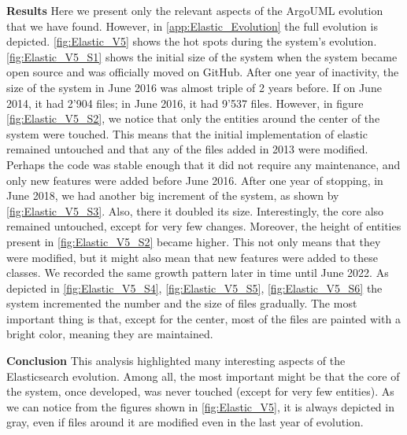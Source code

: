 \textbf{Results}
Here we present only the relevant aspects of the ArgoUML evolution that we have found. However, in \autoref{app:Elastic_Evolution} the full evolution is depicted. \autoref{fig:Elastic_V5} shows the hot spots during the system's evolution. \autoref{fig:Elastic_V5_S1} shows the initial size of the system when the system became open source and was officially moved on GitHub. After one year of inactivity, the size of the system in June 2016 was almost triple of 2 years before. If on June 2014, it had 2'904 files; in June 2016, it had 9'537 files. However, in figure \autoref{fig:Elastic_V5_S2}, we notice that only the entities around the center of the system were touched. This means that the initial implementation of elastic remained untouched and that any of the files added in 2013 were modified. Perhaps the code was stable enough that it did not require any maintenance, and only new features were added before June 2016. After one year of stopping, in June 2018, we had another big increment of the system, as shown by \autoref{fig:Elastic_V5_S3}. Also, there it doubled its size. Interestingly, the core also remained untouched, except for very few changes. Moreover, the height of entities present in \autoref{fig:Elastic_V5_S2} became higher. This not only means that they were modified, but it might also mean that new features were added to these classes. We recorded the same growth pattern later in time until June 2022. As depicted in \autoref{fig:Elastic_V5_S4}, \autoref{fig:Elastic_V5_S5}, \autoref{fig:Elastic_V5_S6} the system incremented the number and the size of files gradually. The most important thing is that, except for the center, most of the files are painted with a bright color, meaning they are maintained. 


\bigbreak
\textbf{Conclusion} This analysis highlighted many interesting aspects of the Elasticsearch evolution. Among all, the most important might be that the core of the system, once developed, was never touched (except for very few entities). As we can notice from the figures shown in  \autoref{fig:Elastic_V5}, it is always depicted in gray, even if files around it are modified even in the last year of evolution. 

